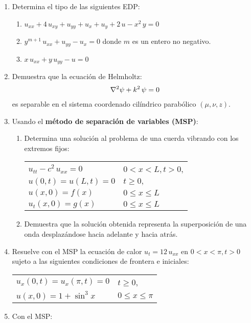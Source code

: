 \begin{enumerate}
\item Determina el tipo de las siguientes EDP:
\begin{enumerate}
\item $u_{xx} + 4 \, u_{xy} + u_{yy} +u_{x} + u_{y} + 2 \, u - x^{2} \, y = 0$
\item $y^{m+1} \, u_{xx} + u_{yy} - u_{x} = 0$ donde $m$ es un entero no negativo.
\item $x \, u_{xx} + y \, u_{yy} - u = 0$
\end{enumerate}
\item Demuestra que la ecuación de Helmholtz:
\begin{align*}
\laplacian{\psi} + k^{2} \, \psi = 0
\end{align*}
es separable en el sistema coordenado cilíndrico parabólico $(\mu, \nu, z)$.
\item Usando el \textbf{método de separación de variables (MSP)}:\begin{enumerate}
\item Determina una solución al problema de una cuerda vibrando con los extremos fijos:
\begin{table}[H]
\centering
\begin{tabular}{ l l}
$u_{tt} - c^{2} \, u_{xx} = 0$ & $0 < x < L, t > 0$, \\
$u(0,t) = u(L, t) = 0$ & $t \geq 0,$ \\
$u(x, 0) = f(x)$ & $0 \leq x \leq L$ \\
$u_{t}(x, 0) = g(x)$ & $0 \leq x \leq L$
\end{tabular}
\end{table}
\item Demuestra que la solución obtenida representa la superposición de una onda desplazándose hacia adelante y hacia atrás.
\end{enumerate}
\item Resuelve con el MSP la ecuación de calor $u_{t} = 12 \, u_{xx}$ en $0 < x < \pi, t > 0$ sujeto a las siguientes condiciones de frontera e iniciales:
\begin{table}[H]
\centering
\begin{tabular}{l l}
$u_{x} (0, t) = u_{x} (\pi, t) = 0$ & $t \geq 0$, \\
$u(x, 0) = 1 + \sin^{3} x$ & $0 \leq x \leq \pi$
\end{tabular}
\end{table}
\item Con el MSP: 

\end{enumerate}
